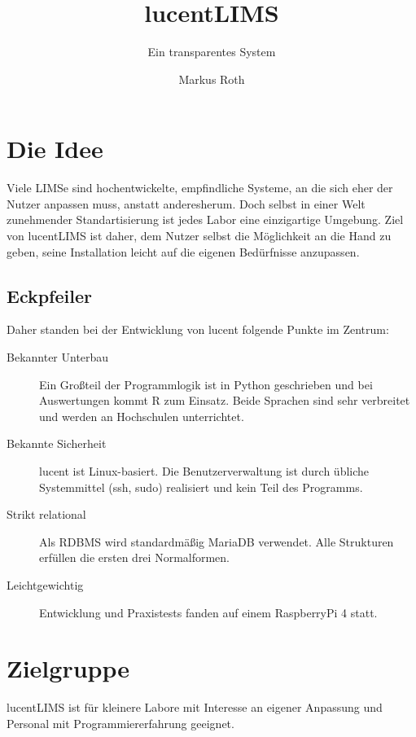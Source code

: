\documentclass[11pt]{scrartcl} %
\title{lucentLIMS}
\subtitle{Ein transparentes System}
\author{Markus Roth}
\begin{document}
\maketitle

\section{Die Idee}
Viele LIMSe sind hochentwickelte, empfindliche Systeme, an die sich eher der Nutzer anpassen muss, anstatt anderesherum. Doch selbst in einer Welt zunehmender Standartisierung ist jedes Labor eine einzigartige Umgebung. Ziel von lucentLIMS ist daher, dem Nutzer selbst die Möglichkeit an die Hand zu geben, seine Installation leicht auf die eigenen Bedürfnisse anzupassen.

\subsection{Eckpfeiler}
Daher standen bei der Entwicklung von lucent folgende Punkte im Zentrum:

\begin{description}

\item[Bekannter Unterbau] Ein Großteil der Programmlogik ist in Python geschrieben und bei Auswertungen kommt R zum Einsatz.
Beide Sprachen sind sehr verbreitet und werden an Hochschulen unterrichtet.

\item[Bekannte Sicherheit] lucent ist Linux-basiert.
Die Benutzerverwaltung ist durch übliche Systemmittel (ssh, sudo) realisiert und kein Teil des Programms.

\item[Strikt relational] Als RDBMS wird standardmäßig MariaDB verwendet.
Alle Strukturen erfüllen die ersten drei Normalformen.

\item[Leichtgewichtig] Entwicklung und Praxistests fanden auf einem RaspberryPi 4 statt.

\end{description}

\section{Zielgruppe}
lucentLIMS ist für kleinere Labore mit Interesse an eigener Anpassung und Personal mit Programmiererfahrung geeignet.
\end{document}
